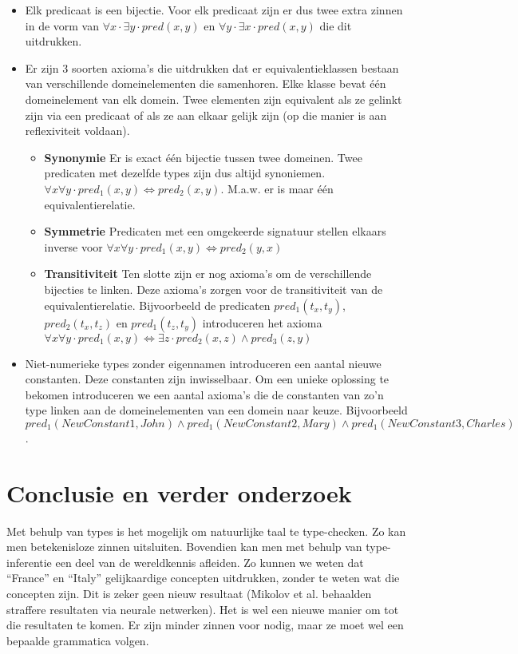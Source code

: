\begin{itemize}
  \item Elk predicaat is een bijectie. Voor elk predicaat zijn er dus twee extra zinnen in de vorm van $\forall x \cdot \exists y \cdot pred(x, y)$ en $\forall y \cdot \exists x \cdot pred(x, y)$ die dit uitdrukken.
  \item Er zijn 3 soorten axioma's die uitdrukken dat er equivalentieklassen bestaan van verschillende domeinelementen die samenhoren. Elke klasse bevat één domeinelement van elk domein. Twee elementen zijn equivalent als ze gelinkt zijn via een predicaat of als ze aan elkaar gelijk zijn (op die manier is aan reflexiviteit voldaan).
    \begin{itemize}
      \item \textbf{Synonymie} Er is exact één bijectie tussen twee domeinen. Twee predicaten met dezelfde types zijn dus altijd synoniemen. $\forall x \forall y \cdot pred_1(x, y) \Leftrightarrow pred_2(x, y)$. M.a.w. er is maar één equivalentierelatie.
      \item \textbf{Symmetrie} Predicaten met een omgekeerde signatuur stellen elkaars inverse voor $\forall x \forall y \cdot pred_1(x, y) \Leftrightarrow pred_2(y, x)$
      \item \textbf{Transitiviteit} Ten slotte zijn er nog axioma's om de verschillende bijecties te linken. Deze axioma's zorgen voor de transitiviteit van de equivalentierelatie. Bijvoorbeeld de predicaten $pred_1(t_x, t_y)$, $pred_2(t_x, t_z)$ en $pred_1(t_z, t_y)$ introduceren het axioma $\forall x \forall y \cdot pred_1(x, y) \Leftrightarrow \exists z \cdot pred_2(x, z) \land pred_3(z, y)$
    \end{itemize}
  \item Niet-numerieke types zonder eigennamen introduceren een aantal nieuwe constanten. Deze constanten zijn inwisselbaar. Om een unieke oplossing te bekomen introduceren we een aantal axioma's die de constanten van zo'n type linken aan de domeinelementen van een domein naar keuze. Bijvoorbeeld $pred_1(NewConstant1, John) \land pred_1(NewConstant2, Mary) \land pred_1(NewConstant3, Charles)$.
\end{itemize}

\section{Conclusie en verder onderzoek}
Met behulp van types is het mogelijk om natuurlijke taal te type-checken. Zo kan men betekenisloze zinnen uitsluiten. Bovendien kan men met behulp van type-inferentie een deel van de wereldkennis afleiden. Zo kunnen we weten dat ``France'' en ``Italy'' gelijkaardige concepten uitdrukken, zonder te weten wat die concepten zijn. Dit is zeker geen nieuw resultaat (Mikolov et al. \cite{Mikolov2013} behaalden straffere resultaten via neurale netwerken). Het is wel een nieuwe manier om tot die resultaten te komen. Er zijn minder zinnen voor nodig, maar ze moet wel een bepaalde grammatica volgen.

